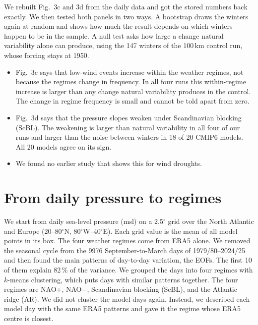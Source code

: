 \documentclass[10pt,a4paper]{article}
\begin{document}
We rebuilt Fig.~3c and 3d from the daily data and got the stored numbers back exactly.
We then tested both panels in two ways.
A bootstrap draws the winters again at random and shows how much the result depends on which winters happen to be in
the sample.
A null test asks how large a change natural variability alone can produce, using the 147 winters of the 100\,km control
run, whose forcing stays at 1950.
\begin{itemize}\setlength{\itemsep}{1pt}
\item Fig.~3c says that low-wind events increase within the weather regimes, not because the regimes change in
      frequency. In all four runs this within-regime increase is larger than any change natural variability produces in
      the control. The change in regime frequency is small and cannot be told apart from zero.
\item Fig.~3d says that the pressure slopes weaken under Scandinavian blocking (ScBL). The weakening is larger than
      natural variability in all four of our runs and larger than the noise between winters in 18 of 20 CMIP6 models.
      All 20 models agree on its sign.
\item We found no earlier study that shows this for wind droughts.
\end{itemize}

\section{From daily pressure to regimes}
\label{sec:regimes}

We start from daily sea-level pressure (msl) on a 2.5$^\circ$ grid over the North Atlantic and Europe
(20--80$^\circ$N, 80$^\circ$W--40$^\circ$E).
Each grid value is the mean of all model points in its box.
The four weather regimes come from ERA5 alone.
We removed the seasonal cycle from the 9976 September-to-March days of 1979/80--2024/25 and then found the main
patterns of day-to-day variation, the EOFs.
The first 10 of them explain 82\,\% of the variance.
We grouped the days into four regimes with $k$-means clustering, which puts days with similar patterns together.
The four regimes are NAO+, NAO$-$, Scandinavian blocking (ScBL), and the Atlantic ridge (AR).
We did not cluster the model days again.
Instead, we described each model day with the same ERA5 patterns and gave it the regime whose ERA5 centre is closest.
\end{document}
